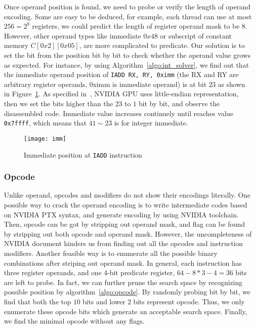 Once operand position is found, we need to probe or verify the length of operand encoding. Some are easy to be
deduced, for example, each thread can use at most $256=2^{8}$ registers, we could predict the length of register 
operand mask to be $8$.
However, other operand types like immediate $0x48$ or subscript of constant memory $C[0x2][0x05]$, are more complicated 
to predicate. Our solution is to set the bit from the position bit by bit to check whether the operand value grows
as expected. For instance, by using Algorithm~\ref{algo:int_solver}, we find out that the immediate operand position 
of {\tt IADD RX, RY, 0ximm} (the RX and RY are arbitrary register operands, 0ximm is immediate operand) is at bit $23$ 
as shown in Figure~\ref{fig:imm}. As specified in~\cite{cuda2015programming}, NVIDIA GPU uses little-endian 
representation, then we set the bits higher than the $23$ to $1$ bit by bit, and observe the disassembled code. 
Immediate value increases continuely until reaches value {\tt 0x7ffff}, which means that $41\sim23$ is for integer 
immediate.%

\begin{figure}[htbp]
\begin{center}
\texttt{[image: imm]}
    \caption{Immediate position at {\tt IADD} instruction}
\label{fig:imm}
\end{center}
\end{figure}

\subsubsection{Opcode}
Unlike operand, opcodes and modifiers do not show their encodings literally. One possible way to crack the operand 
encoding is to write intermediate codes
based on NVIDIA PTX syntax, and generate encoding by using NVIDIA toolchain.
Then, opcode can be got by stripping out operand mask, and flag can be found by stripping out both opcode and operand 
mask. However, the uncompleteness of NVIDIA document hinders us from finding out all the opcodes and instruction modifiers. 
Another feasible way is to enumerate all the possible binary combinations after striping out operand mask.
In general, each instruction has three register operands, and one 4-bit predicate register, $64-8*3-4=36$ bits are left 
to probe.
In fact, we can further prune the search space by recognizing possible position by algorithm~\ref{algo:opcode}. By 
randomly probing bit by bit, we find that both the top $10$ bits and lower $2$ bits represent opcode.
Thus, we only enumerate these opcode bits which generate an acceptable search space. Finally, we find 
the minimal opcode without any flags. 

